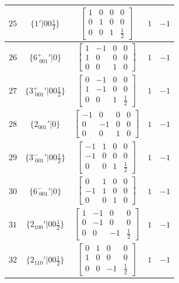\documentclass[fleqn,8pt]{jsarticle}
\begin{document}
\begin{longtable}{ccccc}
$ 25 $ & $ \{1{}'|0 0 \frac{1}{2}\} $ & $ \begin{bmatrix} 1 & 0 & 0 & 0 \\ 0 & 1 & 0 & 0 \\ 0 & 0 & 1 & \frac{1}{2} \end{bmatrix} $ & $ 1 $ & $ -1 $ \\ \hline
$ 26 $ & $ \{6^{+}_{\,\,001}{}'|0\} $ & $ \begin{bmatrix} 1 & -1 & 0 & 0 \\ 1 & 0 & 0 & 0 \\ 0 & 0 & 1 & 0 \end{bmatrix} $ & $ 1 $ & $ -1 $ \\ \hline
$ 27 $ & $ \{3^{+}_{\,\,001}{}'|0 0 \frac{1}{2}\} $ & $ \begin{bmatrix} 0 & -1 & 0 & 0 \\ 1 & -1 & 0 & 0 \\ 0 & 0 & 1 & \frac{1}{2} \end{bmatrix} $ & $ 1 $ & $ -1 $ \\ \hline
$ 28 $ & $ \{2{}_{001}{}'|0\} $ & $ \begin{bmatrix} -1 & 0 & 0 & 0 \\ 0 & -1 & 0 & 0 \\ 0 & 0 & 1 & 0 \end{bmatrix} $ & $ 1 $ & $ -1 $ \\ \hline
$ 29 $ & $ \{3^{-}_{\,\,001}{}'|0 0 \frac{1}{2}\} $ & $ \begin{bmatrix} -1 & 1 & 0 & 0 \\ -1 & 0 & 0 & 0 \\ 0 & 0 & 1 & \frac{1}{2} \end{bmatrix} $ & $ 1 $ & $ -1 $ \\ \hline
$ 30 $ & $ \{6^{-}_{\,\,001}{}'|0\} $ & $ \begin{bmatrix} 0 & 1 & 0 & 0 \\ -1 & 1 & 0 & 0 \\ 0 & 0 & 1 & 0 \end{bmatrix} $ & $ 1 $ & $ -1 $ \\ \hline
$ 31 $ & $ \{2{}_{100}{}'|0 0 \frac{1}{2}\} $ & $ \begin{bmatrix} 1 & -1 & 0 & 0 \\ 0 & -1 & 0 & 0 \\ 0 & 0 & -1 & \frac{1}{2} \end{bmatrix} $ & $ 1 $ & $ -1 $ \\ \hline
$ 32 $ & $ \{2{}_{110}{}'|0 0 \frac{1}{2}\} $ & $ \begin{bmatrix} 0 & 1 & 0 & 0 \\ 1 & 0 & 0 & 0 \\ 0 & 0 & -1 & \frac{1}{2} \end{bmatrix} $ & $ 1 $ & $ -1 $ \\ \hline

\end{longtable}
\end{document}
